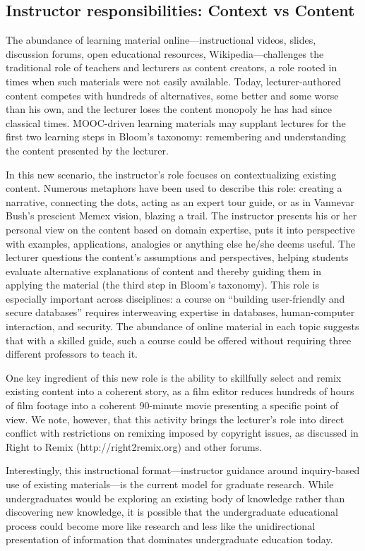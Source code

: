 \subsection{Instructor responsibilities: Context vs Content}

The abundance of learning material online---instructional videos,
slides, discussion forums, open educational resources,
Wikipedia---challenges the traditional role of teachers and lecturers as
content creators, a role rooted in times when such materials were not
easily available.
Today, lecturer-authored content competes with hundreds of alternatives,
some better and some worse than his own, and the lecturer
loses the content monopoly he has had since classical times.
MOOC-driven learning materials may supplant lectures for the first two
learning steps in Bloom's taxonomy:  remembering and understanding the content
presented by the lecturer.

In this new scenario, the instructor's role focuses on contextualizing
existing content.
Numerous metaphors have been used to describe this role: creating a
narrative, connecting the dots, acting as an expert tour guide, or as in
Vannevar Bush's prescient Memex vision, blazing a trail.
The instructor presents his or her personal view on the content based on
domain expertise, puts it into perspective with examples, applications,
analogies or anything else he/she deems useful. The lecturer questions
the content's assumptions and perspectives, helping students evaluate
alternative explanations of content and thereby guiding them in applying
the material (the third step in Bloom's taxonomy).
This role is especially important across disciplines: a course on
``building user-friendly and secure databases'' requires interweaving
expertise in databases, human-computer interaction, and security.
The abundance of online material in each topic suggests that with a
skilled guide, such a course could be offered without requiring three different
professors to teach it.
 
One key ingredient of this new role is the ability to 
skillfully select and remix existing content into a coherent story,
as a film editor reduces hundreds of hours of film footage into a
coherent 90-minute movie presenting a specific point of view.
We note, however, that this activity brings the lecturer's role into direct
conflict with restrictions on remixing imposed by copyright issues, as
discussed in Right to Remix (http://right2remix.org) and other forums.

Interestingly, this instructional format---instructor guidance around
inquiry-based use of existing materials---is the current model for
graduate research.  While undergraduates would be exploring an existing
body of knowledge rather than discovering new knowledge, it is possible
that the undergraduate educational process could become more like
research and less like the unidirectional presentation of information
that dominates undergraduate education today.


